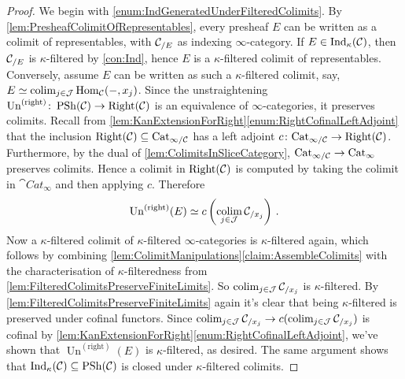 \begin{proof}
	We begin with \cref{enum:IndGeneratedUnderFilteredColimits}. By \cref{lem:PresheafColimitOfRepresentables}, every presheaf $E$ can be written as a colimit of representables, with $\mathcal{C}_{/E}$ as indexing $\infty$-category. If $E\in\mathrm{Ind}_\kappa(\mathcal{C})$, then $\mathcal{C}_{/E}$ is $\kappa$-filtered by \cref{con:Ind}, hence $E$ is a $\kappa$-filtered colimit of representables. Conversely, assume $E$ can be written as such a $\kappa$-filtered colimit, say, $E\simeq\operatorname*{colim}_{j\in\mathcal{J}}\operatorname{Hom}_{\mathcal{C}}(-,x_j)$. Since the unstraightening $\operatorname{Un}^{(\mathrm{right})}\colon \operatorname{PSh}(\mathcal{C})\rightarrow\mathrm{Right}(\mathcal{C})$ is an equivalence of $\infty$-categories, it preserves colimits. Recall from \cref{lem:KanExtensionForRight}\cref{enum:RightCofinalLeftAdjoint} that the inclusion $\mathrm{Right}(\mathcal{C})\subseteq\mathrm{Cat}_{\infty/\mathcal{C}}$ has a left adjoint $c\colon \mathrm{Cat}_{\infty/\mathcal{C}}\rightarrow\mathrm{Right}(\mathcal{C})$. Furthermore, by the dual of \cref{lem:ColimitsInSliceCategory}, $\mathrm{Cat}_{\infty/\mathcal{C}}\rightarrow\operatorname{Cat}_\infty$ preserves colimits. Hence a colimit in $\mathrm{Right}(\mathcal{C})$ is computed by taking the colimit in $\cat{Cat}_\infty$ and then applying $c$. Therefore
	\begin{equation*}
		\operatorname{Un}^{(\mathrm{right})}(E)\simeq c\left(\operatorname*{colim}_{j\in\mathcal{J}}\mathcal{C}_{/x_j}\right)\,.
	\end{equation*}
	Now a $\kappa$-filtered colimit of $\kappa$-filtered $\infty$-categories is $\kappa$-filtered again, which follows by combining \cref{lem:ColimitManipulations}\cref{claim:AssembleColimits} with the characterisation of $\kappa$-filteredness from \cref{lem:FilteredColimitsPreserveFiniteLimits}. So $\operatorname*{colim}_{j\in\mathcal{J}}\mathcal{C}_{/x_j}$ is $\kappa$-filtered. By \cref{lem:FilteredColimitsPreserveFiniteLimits} again it's clear that being $\kappa$-filtered is preserved under cofinal functors. Since $\operatorname*{colim}_{j\in\mathcal{J}}\mathcal{C}_{/x_j}\rightarrow c(\operatorname*{colim}_{j\in\mathcal{J}}\mathcal{C}_{/x_j})$ is cofinal by \cref{lem:KanExtensionForRight}\cref{enum:RightCofinalLeftAdjoint}, we've shown that $\operatorname{Un}^{(\mathrm{right})}(E)$ is $\kappa$-filtered, as desired. The same argument shows that $\mathrm{Ind}_\kappa(\mathcal{C})\subseteq \operatorname{PSh}(\mathcal{C})$ is closed under $\kappa$-filtered colimits.
	

\end{proof}
